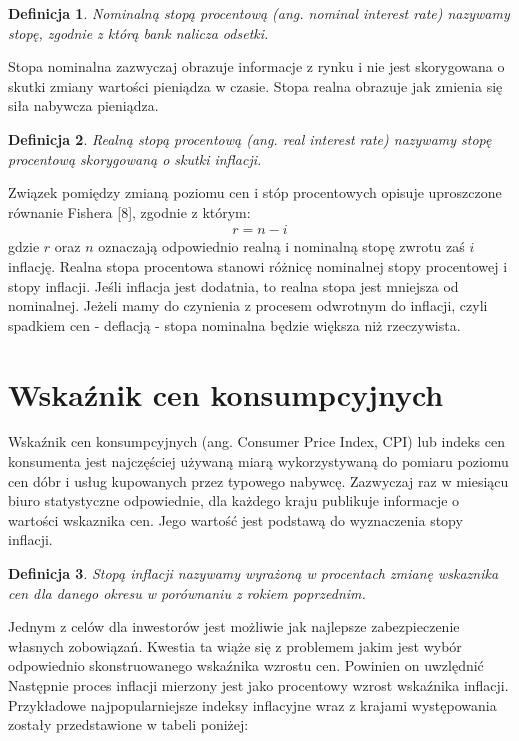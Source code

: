 \documentclass{mini}
\theoremstyle{mythstyle}
\newtheorem{Definicja}{Definicja}[chapter]
\begin{document}
	\begin{Definicja}
			Nominalną stopą procentową (ang. nominal interest rate) nazywamy stopę, zgodnie z którą bank nalicza odsetki.
	\end{Definicja}
	Stopa nominalna zazwyczaj obrazuje informacje z rynku i nie jest skorygowana o skutki zmiany wartości pieniądza w czasie. Stopa realna obrazuje jak zmienia się siła nabywcza pieniądza.\\
	\begin{Definicja}
		Realną stopą procentową (ang. real interest rate) nazywamy stopę procentową skorygowaną o skutki inflacji.
	\end{Definicja}
	Związek pomiędzy zmianą poziomu cen i stóp procentowych opisuje uproszczone równanie Fishera [8], zgodnie z którym:
	\begin{eqnarray}
		r = n - i
	 \end{eqnarray}
	gdzie $r$ oraz $n$ oznaczają odpowiednio realną i nominalną stopę zwrotu zaś $i$ inflację. Realna stopa procentowa stanowi różnicę nominalnej stopy procentowej i stopy inflacji.
	Jeśli inflacja jest dodatnia, to realna stopa jest mniejsza od nominalnej. Jeżeli mamy do czynienia z procesem odwrotnym do inflacji, czyli spadkiem cen - deflacją - stopa nominalna będzie większa niż rzeczywista. 
	
	\section{Wskaźnik cen konsumpcyjnych}
		
	 Wskaźnik cen konsumpcyjnych (ang. Consumer Price Index, CPI) lub indeks cen konsumenta jest najczęściej używaną miarą wykorzystywaną do pomiaru poziomu cen dóbr i usług kupowanych przez typowego nabywcę. Zazwyczaj raz w miesiącu biuro statystyczne odpowiednie, dla każdego kraju publikuje informacje o wartości wskaznika cen. Jego wartość jest podstawą do wyznaczenia stopy inflacji.\\
	 \begin{Definicja}
	 	Stopą inflacji nazywamy wyrażoną w procentach zmianę wskaznika cen dla danego okresu w porównaniu z rokiem poprzednim.
	 \end{Definicja} 
	 Jednym z celów dla inwestorów jest możliwie jak najlepsze zabezpieczenie własnych zobowiązań. Kwestia ta wiąże się z problemem jakim jest wybór odpowiednio skonstruowanego wskaźnika wzrostu cen. Powinien on uwzlędnić Następnie proces inflacji mierzony jest jako procentowy wzrost wskaźnika inflacji. Przykładowe najpopularniejsze indeksy inflacyjne wraz z krajami występowania zostały przedstawione w tabeli poniżej:
	
\end{document}
